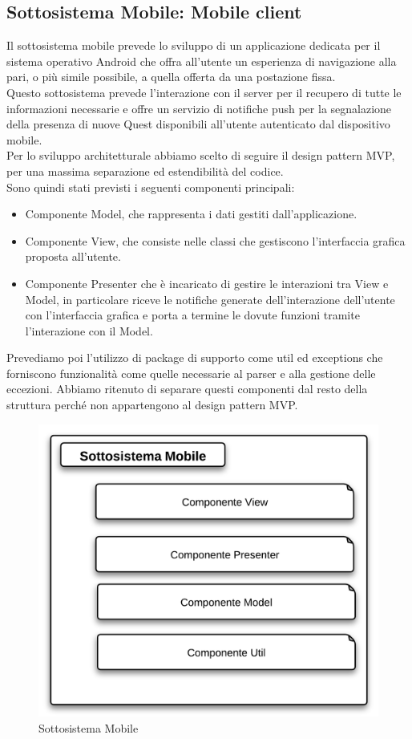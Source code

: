 \subsection{Sottosistema Mobile: Mobile client}
Il sottosistema mobile prevede lo sviluppo di un applicazione dedicata per il sistema operativo Android che offra all'utente un esperienza di navigazione alla pari, o più simile possibile, a quella offerta da una postazione fissa.\\
Questo sottosistema prevede l'interazione con il server per il recupero di tutte le informazioni necessarie e offre un servizio di notifiche push per la segnalazione della presenza di nuove Quest disponibili all'utente autenticato dal dispositivo mobile.\\
Per lo sviluppo architetturale abbiamo scelto di seguire il design pattern MVP, per una massima separazione ed estendibilità del codice.\\
Sono quindi stati previsti i seguenti componenti principali:
\begin{itemize}
\item Componente Model, che rappresenta i dati gestiti dall'applicazione.
\item Componente View, che consiste nelle classi che gestiscono l'interfaccia grafica proposta all'utente.
\item Componente Presenter che è incaricato di gestire le interazioni tra View e Model, in particolare riceve le notifiche generate dell'interazione dell'utente con l'interfaccia grafica e porta a termine le dovute funzioni tramite l'interazione con il Model.
\end{itemize}
Prevediamo poi l'utilizzo di package di supporto come util ed exceptions che forniscono funzionalità come quelle necessarie al parser e alla gestione delle eccezioni. Abbiamo ritenuto di separare questi componenti dal resto della struttura perché non appartengono al design pattern MVP.

\begin{figure}[H]
\centering
\includegraphics[scale=0.7]{images/Mobile/sottosistemaMobile.png} %
\caption{Sottosistema Mobile}
\end{figure}


